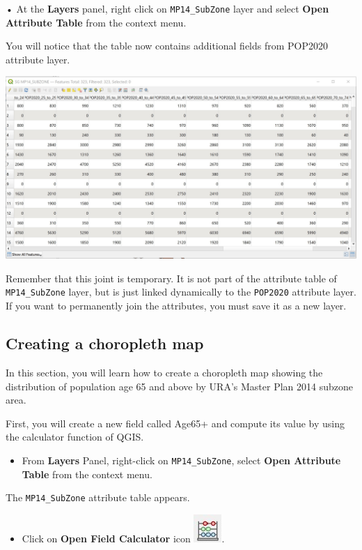 \documentclass[
  letterpaper,
  DIV=11,
  numbers=noendperiod]{scrreprt}
\providecommand{\tightlist}{%
  \setlength{\itemsep}{0pt}\setlength{\parskip}{0pt}}\usepackage{longtable,booktabs,array}
\begin{document}
• At the \textbf{Layers} panel, right click on \texttt{MP14\_SubZone}
layer and select \textbf{Open Attribute Table} from the context menu.

You will notice that the table now contains additional fields from
POP2020 attribute layer.

\includegraphics{./img03/image29.jpg}

Remember that this joint is temporary. It is not part of the attribute
table of \texttt{MP14\_SubZone} layer, but is just linked dynamically to
the \texttt{POP2020} attribute layer. If you want to permanently join
the attributes, you must save it as a new layer.

\hypertarget{creating-a-choropleth-map}{%
\subsection{Creating a choropleth map}\label{creating-a-choropleth-map}}

In this section, you will learn how to create a choropleth map showing
the distribution of population age 65 and above by URA's Master Plan
2014 subzone area.

First, you will create a new field called Age65+ and compute its value
by using the calculator function of QGIS.

\begin{itemize}
\tightlist
\item
  From \textbf{Layers} Panel, right-click on \texttt{MP14\_SubZone},
  select \textbf{Open Attribute Table} from the context menu.
\end{itemize}

The \texttt{MP14\_SubZone} attribute table appears.

\begin{itemize}
\tightlist
\item
  Click on \textbf{Open Field Calculator} icon
  \includegraphics{./img03/image23.jpg}.
\end{itemize}
\end{document}

